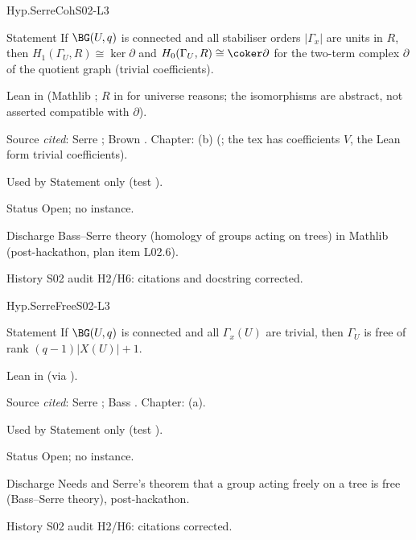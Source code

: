 \begin{hypentry}{Hyp.SerreCoh}{\kindlit}{S02-L3}
\item[Statement] If $\BG(U,q)$ is connected and all stabiliser orders $|\Gamma_x|$ are units in $R$, then
  $H_1(\Gamma_U,R)\cong\ker\partial$ and $H_0(\Gamma_U,R)\cong\coker\partial$ for the two-term complex $\partial$ of the
  quotient graph (trivial coefficients).
\item[Lean]  in  (Mathlib ;
  $R$ in  for universe reasons; the isomorphisms are abstract, not asserted compatible with $\partial$).
\item[Source] \emph{cited}: Serre \cite[II.2.8, Prop.~13 and Rem.~1]{Se}; Brown \cite[VII.7]{Br}. Chapter:
  (b) (\stpmc; the tex has coefficients $V$, the Lean form trivial coefficients).
\item[Used by] Statement only (test ).
\item[Status] Open; no instance.
\item[Discharge] Bass--Serre theory (homology of groups acting on trees) in Mathlib (post-hackathon, plan item L02.6).
\item[History] S02 audit H2/H6: citations and docstring corrected.
\end{hypentry}

\begin{hypentry}{Hyp.SerreFree}{\kindlit}{S02-L3}
\item[Statement] If $\BG(U,q)$ is connected and all $\Gamma_x(U)$ are trivial, then $\Gamma_U$ is free of rank
  $(q-1)|X(U)|+1$.
\item[Lean]  in  (via
  ).
\item[Source] \emph{cited}: Serre \cite[I.3.3, Thm.~4$'$; II.1.5, Thm.~4]{Se}; Bass \cite[3.6]{Bass1993}.
  Chapter: (a).
\item[Used by] Statement only (test ).
\item[Status] Open; no instance.
\item[Discharge] Needs  and Serre's theorem that a group acting freely on a tree is free
  (Bass--Serre theory), post-hackathon.
\item[History] S02 audit H2/H6: citations corrected.
\end{hypentry}

